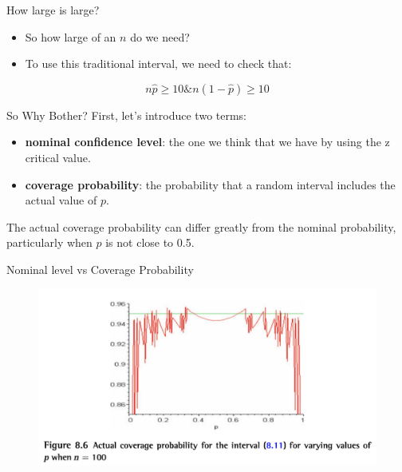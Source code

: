 \documentclass[
  ignorenonframetext,
]{beamer}
\providecommand{\tightlist}{%
  \setlength{\itemsep}{0pt}\setlength{\parskip}{0pt}}\usepackage{longtable,booktabs,array}
\begin{document}
\begin{frame}{How large is large?}
\protect\hypertarget{how-large-is-large}{}
\begin{itemize}[<+->]
\tightlist
\item
  So how large of an \(n\) do we need?
\item
  To use this traditional interval, we need to check that:
\end{itemize}

\[
n\hat{p} \geq 10 \& n(1-\hat{p}) \geq 10
\]
\end{frame}

\begin{frame}{So Why Bother?}
\protect\hypertarget{so-why-bother}{}
First, let's introduce two terms:

\begin{itemize}[<+->]
\tightlist
\item
  \textbf{nominal confidence level}: the one we think that we have by
  using the z critical value.
\item
  \textbf{coverage probability}: the probability that a random interval
  includes the actual value of \(p\).
\end{itemize}

The actual coverage probability can differ greatly from the nominal
probability, particularly when \(p\) is not close to 0.5.
\end{frame}

\begin{frame}{Nominal level vs Coverage Probability}
\protect\hypertarget{nominal-level-vs-coverage-probability}{}
\begin{figure}

{\centering \includegraphics{images/nominal.png}

}

\end{figure}
\end{frame}
\end{document}
